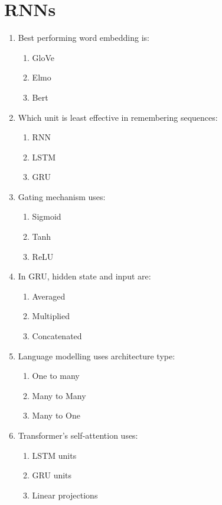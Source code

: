 \documentclass{report}
\numberwithin{equation}{section}
\begin{document}
\section{RNNs}

\begin{enumerate}
    \item Best performing word embedding is:
    \begin{enumerate}[label=\alph*.]
        \item GloVe
        \item Elmo
        \item Bert
    \end{enumerate}
    \item Which unit is least effective in remembering sequences:
    \begin{enumerate}[label=\alph*.]
        \item RNN
        \item LSTM
        \item GRU
    \end{enumerate}
    \item Gating mechanism uses:
    \begin{enumerate}[label=\alph*.]
        \item Sigmoid
        \item Tanh
        \item ReLU
    \end{enumerate}
    \item In GRU, hidden state and input are:
    \begin{enumerate}[label=\alph*.]
        \item Averaged
        \item Multiplied
        \item Concatenated
    \end{enumerate}
    \item Language modelling uses architecture type:
    \begin{enumerate}[label=\alph*.]
        \item One to many
        \item Many to Many
        \item Many to One
    \end{enumerate}
    \item Transformer's self-attention uses:
    \begin{enumerate}[label=\alph*.]
        \item LSTM units
        \item GRU units
        \item Linear projections
    \end{enumerate}
\end{enumerate}
\end{document}
